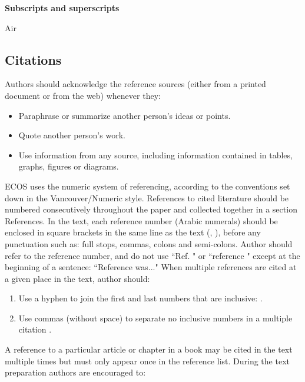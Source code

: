 \documentclass{ECOS_2021}
\begin{document}
\textbf{Subscripts and superscripts}
\begin{description}[leftmargin=!,labelwidth=\widthof{maxlength}]
    \item[a] Air
\end{description}

\sffamily \large \subsection{Citations}
\rmfamily \normalsize
Authors should acknowledge the reference sources (either from a printed document or from the web) whenever they:
%
\begin{itemize}
    \item Paraphrase or summarize another person's ideas or points.
    \item Quote another person's work.
    \item Use information from any source, including information contained in tables, graphs, figures or diagrams.
\end{itemize}
%
ECOS uses the numeric system of referencing, according to the conventions set down in the Vancouver/Numeric style. References to cited literature should be numbered consecutively throughout the paper and collected together in a section References.
In the text, each reference number (Arabic numerals) should be enclosed in square brackets in the same line as the text (\cite{journal}, \cite{proceedings}), before any punctuation such as: full stops, commas, colons and semi-colons. Author should refer to the reference number, and do not use ``Ref. \cite{chapter}" or ``reference \cite{chapter}" except at the beginning of a sentence: ``Reference \cite{chapter} was..." When multiple references are cited at a given place in the text, author should:
%
\begin{enumerate}
    \item Use a hyphen to join the first and last numbers that are inclusive: \cite{proceedings,chapter,books,report}.
    \item Use commas (without space) to separate no inclusive numbers in a multiple citation \cite{proceedings,chapter,books,report, web_references}.
\end{enumerate}
%
A reference to a particular article or chapter in a book may be cited in the text multiple times but must only appear once in the reference list. During the text preparation authors are encouraged to:
\end{document}
